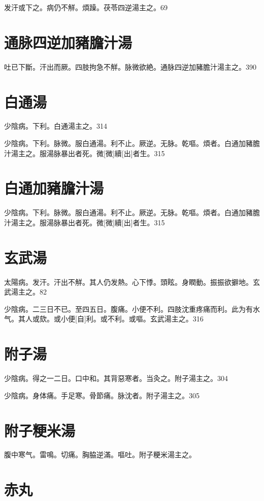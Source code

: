 \documentclass[12pt,twoside,UTF8,b5paper]{ctexbook}
\begin{document}
发汗或下之。病仍不觧。煩躁。茯苓四逆湯主之。69

\section{通脉四逆加豬膽汁湯}

吐已下斷。汗出而厥。四肢拘急不觧。脉微欲絶。通脉四逆加豬膽汁湯主之。390

\section{白通湯}

少陰病。下利。白通湯主之。314

少陰病。下利。脉微。服白通湯。利不止。厥逆。无脉。乾嘔。煩者。白通加豬膽汁湯主之。服湯脉暴出者死。微[微]續[出]者生。315

\section{白通加豬膽汁湯}

少陰病。下利。脉微。服白通湯。利不止。厥逆。无脉。乾嘔。煩者。白通加豬膽汁湯主之。服湯脉暴出者死。微[微]續[出]者生。315

\section{玄武湯}

太陽病。发汗。汗出不觧。其人仍发熱。心下悸。頭眩。身瞤動。振振欲擗地。玄武湯主之。82

少陰病。二三日不已。至四五日。腹痛。小便不利。四肢沈重疼痛而利。此为有水气。其人或欬。或小便[自]利。或不利。或嘔。玄武湯主之。316

\section{附子湯}

少陰病。得之一二日。口中和。其背惡寒者。当灸之。附子湯主之。304

少陰病。身体痛。手足寒。骨節痛。脉沈者。附子湯主之。305

\section{附子粳米湯}

腹中寒气。雷鳴。切痛。胸脇逆滿。嘔吐。附子粳米湯主之。

\section{赤丸}
\end{document}
